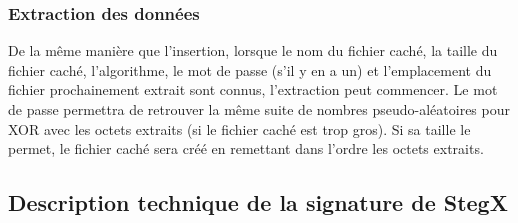 \documentclass[11pt]{article}
\begin{document}
\subsubsection{Extraction des données}

De la même manière que l'insertion, lorsque le nom du fichier caché, la taille 
du fichier caché, l'algorithme, le mot de passe (s'il y en a un) et l'emplacement
du fichier prochainement extrait sont connus, l'extraction peut commencer. 
Le mot de passe permettra de retrouver la même suite de nombres pseudo-aléatoires 
pour XOR avec les octets extraits (si le fichier caché est trop gros). 
Si sa taille le permet, le fichier caché sera créé en remettant dans l'ordre 
les octets extraits. 

\subsection{Description technique de la signature de StegX}
\end{document}
